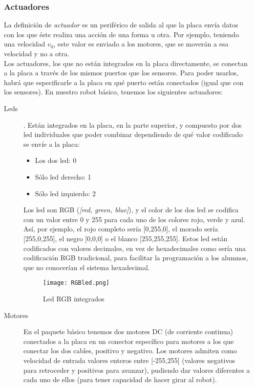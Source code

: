 \subsubsection{Actuadores}\label{subsec:actuadores}
	La definición de \textit{actuador} es un periférico de salida al que la placa envía datos con los que éste realiza una acción de una forma u otra. Por ejemplo, teniendo una velocidad $v_0$, este valor es enviado a los motores, que se moverán a esa velocidad y no a otra. \\
	Los actuadores, los que no están integrados en la placa directamente, se conectan a la placa a través de los mismos puertos que los sensores. Para poder usarlos, habrá que especificarle a la placa en qué puerto están conectados (igual que con los sensores). En nuestro robot básico, tenemos los siguientes actuadores:
	\begin{description}
		\item [Leds]. Están integrados en la placa, en la parte superior, y compuesto por dos led individuales que poder combinar dependiendo de qué valor codificado se envíe a la placa:
		\begin{itemize}
			\item Los dos led: 0
			\item Sólo led derecho: 1
			\item Sólo led izquierdo: 2
		\end{itemize}
		Los led son RGB (\textit{[red, green, blue]}), y el color de los dos led se codifica con un valor entre 0 y 255 para cada uno de los colores rojo, verde y azul. Así, por ejemplo, el rojo completo sería [0,255,0], el morado sería [255,0,255], el negro [0,0,0] o el blanco [255,255,255]. Estos led están codificados con valores decimales, en vez de hexadecimales como sería una codificación RGB tradicional, para facilitar la programación a los alumnos, que no conocerían el sistema hexadecimal.
		\begin{figure}[H]
			\texttt{[image: RGBled.png]}
			\centering
			\label{img:led}
			\caption{Led RGB integrados}
		\end{figure}
		\item [Motores] En el paquete básico tenemos dos motores DC (de corriente continua) conectados a la placa en un conector específico para motores a los que conectar los dos cables, positivo y negativo. Los motores admiten como velocidad de entrada valores enteros entre [-255,255] (valores negativos para retroceder y positivos para avanzar), pudiendo dar valores diferentes a cada uno de ellos (para tener capacidad de hacer girar al robot).

\end{description}
